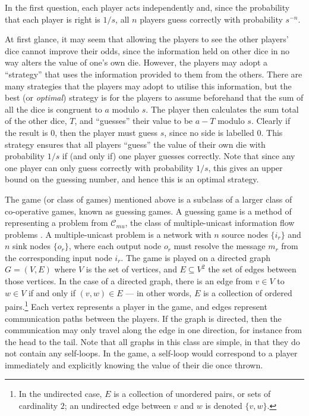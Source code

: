 In the first question, each player acts independently and, since the probability that each player is right is $1/s$, all $n$ players guess correctly with probability $s^{-n}$. 

At first glance, it may seem that allowing the players to see the other players' dice cannot improve their odds, since the information held on other dice in no way alters the value of one's own die. However, the players may adopt a ``strategy'' that uses the information provided to them from the others. There are many strategies that the players may adopt to utilise this information, but the best (or \emph{optimal}) strategy is for the players to assume beforehand that the sum of all the dice is congruent to $a$ modulo $s$. The player then calculates the sum total of the other dice, $T$, and ``guesses'' their value to be $a - T$ modulo $s$. Clearly if the result is $0$, then the player must guess $s$, since no side is labelled $0$. This strategy ensures that all players ``guess'' the value of their own die with probability $1/s$ if (and only if) one player guesses correctly. Note that since any one player can only guess correctly with probability $1/s$, this gives an upper bound on the guessing number, and hence this is an optimal strategy.

The game (or class of games) mentioned above is a subclass of a larger class of co-operative games, known as guessing games. A guessing game is a method of representing a problem from $\mathcal{C}_{mu}$, the class of multiple-unicast information flow problems \cite{riis2005util}. A multiple-unicast problem is a network with $n$ source nodes $\{i_r\}$ and $n$ sink nodes $\{o_r\}$, where each output node $o_r$ must resolve the message $m_r$ from the corresponding input node $i_r$. The game is played on a directed graph $G = (V, E)$ where $V$ is the set of vertices, and $E \subseteq V^2$ the set of edges between those vertices. In the case of a directed graph, there is an edge from $v \in V$ to $w \in V$ if and only if $(v, w) \in E$ --- in other words, $E$ is a collection of ordered pairs.\footnote{In the undirected case, $E$ is a collection of unordered pairs, or sets of cardinality $2$; an undirected edge between $v$ and $w$ is denoted $\{v, w\}$.} Each vertex represents a player in the game, and edges represent communication paths between the players. If the graph is directed, then the communication may only travel along the edge in one direction, for instance from the head to the tail. Note that all graphs in this class are simple, in that they do not contain any self-loops. In the game, a self-loop would correspond to a player immediately and explicitly knowing the value of their die once thrown.

